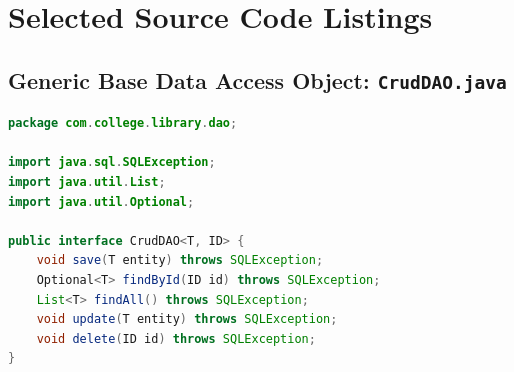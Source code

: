 \newpage
\chapter{Selected Source Code Listings}

\section{Generic Base Data Access Object: \texttt{CrudDAO.java}}
\begin{lstlisting}[language=Java, caption={Generic CrudDAO Interface}]
package com.college.library.dao;

import java.sql.SQLException;
import java.util.List;
import java.util.Optional;

public interface CrudDAO<T, ID> {
    void save(T entity) throws SQLException;
    Optional<T> findById(ID id) throws SQLException;
    List<T> findAll() throws SQLException;
    void update(T entity) throws SQLException;
    void delete(ID id) throws SQLException;
}
\end{lstlisting}

